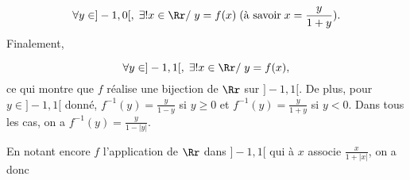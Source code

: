 {\begin{enumerate}
{$$\forall y\in]-1,0[,\;\exists!x\in\Rr/\;y=f(x)\;(\mbox{à savoir}\;x=\frac{y}{1+y}).$$
Finalement,

$$\forall y\in]-1,1[,\;\exists!x\in\Rr/\;y=f(x),$$
ce qui montre que $f$ réalise une bijection de $\Rr$ sur $]-1,1[$. De plus, pour $y\in]-1,1[$ donné,
$f^{-1}(y)=\frac{y}{1-y}$ si $y\geq0$ et $f^{-1}(y)=\frac{y}{1+y}$ si $y<0$. Dans tous les cas, on a
$f^{-1}(y)=\frac{y}{1-|y|}$.

En notant encore $f$ l'application de $\Rr$ dans $]-1,1[$ qui à $x$ associe $\frac{x}{1+|x|}$, on a donc
\begin{center}
\shadowbox{
$\forall x\in]-1,1[,\;f^{-1}(x)=\frac{x}{1-|x|}.$
}
\end{center}}
\end{enumerate}
}
